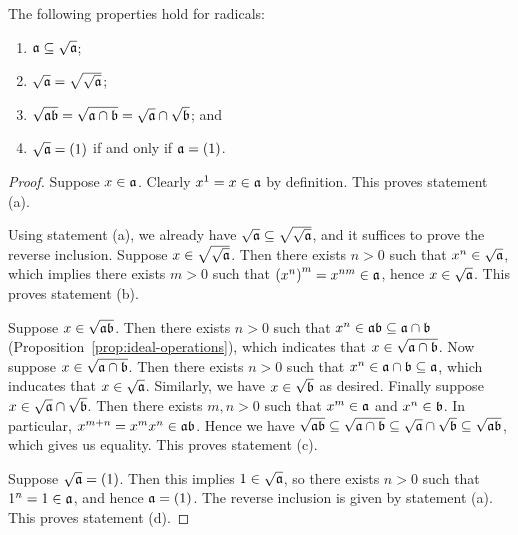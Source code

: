 \begin{proposition}\label{prop:radical-properties}
    The following properties hold for radicals:
    \begin{enumerate}[label={(\alph*)}, itemsep=0mm]
        \item \(\mathfrak{a} \subseteq \sqrt{\mathfrak{a}}\);
        \item \(\sqrt{\mathfrak{a}} = \sqrt{\sqrt{\mathfrak{a}}}\);
        \item \(\sqrt{\mathfrak{ab}} = \sqrt{\mathfrak{a \cap b}} = \sqrt{\mathfrak{a}} \cap \sqrt{\mathfrak{b}}\); and
        \item \(\sqrt{\mathfrak{a}} = (1)\) if and only if \(\mathfrak{a} = (1)\).
    \end{enumerate}
\end{proposition}
\begin{proof}
    Suppose \(x \in \mathfrak{a}\).
    Clearly \(x^1 = x \in \mathfrak{a}\) by definition.
    This proves statement (a).

    Using statement (a), we already have \(\sqrt{\mathfrak{a}} \subseteq \sqrt{\sqrt{\mathfrak{a}}}\),
    and it suffices to prove the reverse inclusion.
    Suppose \(x \in \sqrt{\sqrt{\mathfrak{a}}}\).
    Then there exists \(n > 0\) such that \(x^n \in \sqrt{\mathfrak{a}}\),
    which implies there exists \(m > 0\) such that \({(x^n)}^m = x^{nm} \in \mathfrak{a}\),
    hence \(x \in \sqrt{\mathfrak{a}}\).
    This proves statement (b).

    Suppose \(x \in \sqrt{\mathfrak{ab}}\).
    Then there exists \(n > 0\) such that \(x^n \in \mathfrak{ab} \subseteq \mathfrak{a \cap b}\)
    (Proposition~\ref{prop:ideal-operations}),
    which indicates that \(x \in \sqrt{\mathfrak{a \cap b}}\).
    Now suppose \(x \in \sqrt{\mathfrak{a \cap b}}\).
    Then there exists \(n > 0\) such that \(x^n \in \mathfrak{a \cap b} \subseteq \mathfrak{a}\),
    which inducates that \(x \in \sqrt{\mathfrak{a}}\).
    Similarly, we have \(x \in \sqrt{\mathfrak{b}}\) as desired.
    Finally suppose \(x \in \sqrt{\mathfrak{a}} \cap \sqrt{\mathfrak{b}}\).
    Then there exists \(m,n > 0\) such that \(x^m \in \mathfrak{a}\) and \(x^n \in \mathfrak{b}\).
    In particular, \(x^{m+n} = x^m x^n \in \mathfrak{ab}\).
    Hence we have \(\sqrt{\mathfrak{ab}} \subseteq \sqrt{\mathfrak{a \cap b}} \subseteq
    \sqrt{\mathfrak{a}} \cap \sqrt{\mathfrak{b}} \subseteq \sqrt{\mathfrak{ab}}\),
    which gives us equality.
    This proves statement (c).

    Suppose \(\sqrt{\mathfrak{a}} = (1)\).
    Then this implies \(1 \in \sqrt{\mathfrak{a}}\),
    so there exists \(n > 0\) such that \(1^n = 1 \in \mathfrak{a}\),
    and hence \(\mathfrak{a} = (1)\).
    The reverse inclusion is given by statement (a).
    This proves statement (d).
\end{proof}

